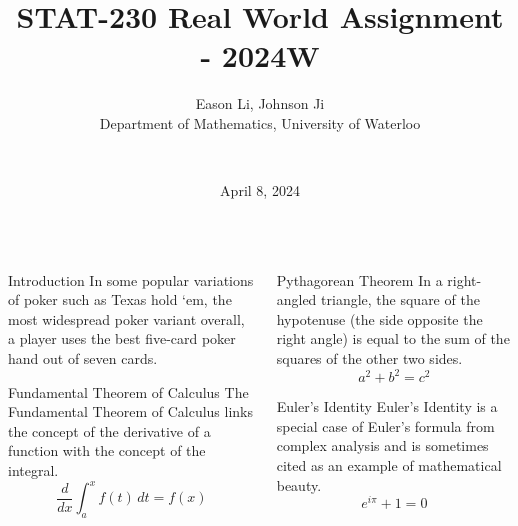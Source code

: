 \documentclass[final]{beamer}
\title{STAT-230 Real World Assignment - 2024W}
\author{
    Eason Li, Johnson Ji \\
    Department of Mathematics, University of Waterloo \and \\
}
\date{April 8, 2024} %
\begin{document}
\maketitle


\begin{frame}[t]
\begin{columns}[t]

    \begin{column}{.48\linewidth}


    \begin{block}{Introduction}
        In some popular variations of poker such as Texas hold `em, 
        the most widespread poker variant overall, a player uses the best five-card poker hand out of seven cards.
    \end{block}

    \begin{block}{Fundamental Theorem of Calculus}
    The Fundamental Theorem of Calculus links the concept of the derivative of a function with the concept of the integral.
    \[
    \frac{d}{dx} \int_a^x f(t)\, dt = f(x)
    \]
    \end{block}
    \end{column}

    \begin{column}{.48\linewidth}
    \begin{block}{Pythagorean Theorem}
    In a right-angled triangle, the square of the hypotenuse (the side opposite the right angle) is equal to the sum of the squares of the other two sides.
    \[
    a^2 + b^2 = c^2
    \]
    \end{block}

    \begin{block}{Euler's Identity}
    Euler's Identity is a special case of Euler's formula from complex analysis and is sometimes cited as an example of mathematical beauty.
    \[
    e^{i\pi} + 1 = 0
    \]
    \end{block}
    \end{column}


\end{columns}
\end{frame}
\end{document}
